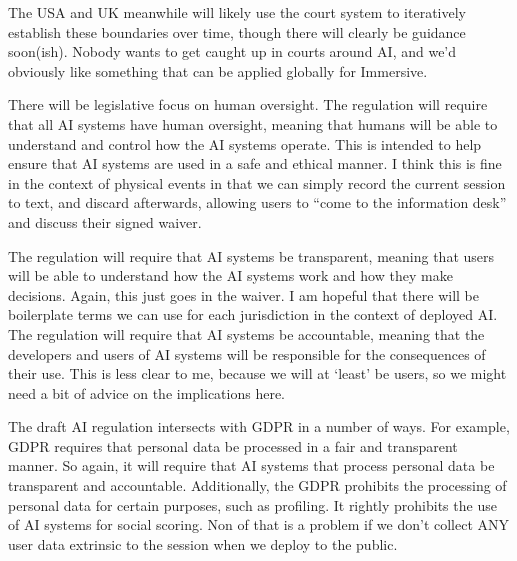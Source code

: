 The USA and UK meanwhile will likely use the court system to iteratively establish these boundaries over time, though there will clearly be guidance soon(ish). Nobody wants to get caught up in courts around AI, and we'd obviously like something that can be applied globally for Immersive.\par
There will be legislative focus on human oversight. The regulation will require that all AI systems have human oversight, meaning that humans will be able to understand and control how the AI systems operate. This is intended to help ensure that AI systems are used in a safe and ethical manner. I think this is fine in the context of physical events in that we can simply record the current session to text, and discard afterwards, allowing users to ``come to the information desk'' and discuss their signed waiver. \par 
The regulation will require that AI systems be transparent, meaning that users will be able to understand how the AI systems work and how they make decisions. Again, this just goes in the waiver. I am hopeful that there will be boilerplate terms we can use for each jurisdiction in the context of deployed AI. The regulation will require that AI systems be accountable, meaning that the developers and users of AI systems will be responsible for the consequences of their use. This is less clear to me, because we will at `least' be users, so we might need a bit of advice on the implications here.\par
The draft AI regulation intersects with GDPR in a number of ways. For example, GDPR requires that personal data be processed in a fair and transparent manner. So again, it will require that AI systems that process personal data be transparent and accountable. Additionally, the GDPR prohibits the processing of personal data for certain purposes, such as profiling. It rightly prohibits the use of AI systems for social scoring. Non of that is a problem if we don't collect ANY user data extrinsic to the session when we deploy to the public.\par
